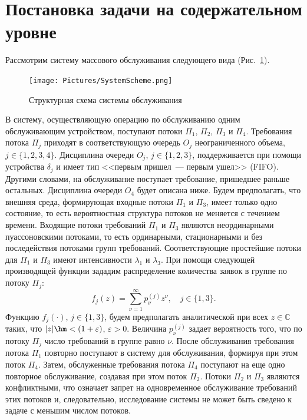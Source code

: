 \section{Постановка задачи на содержательном уровне}
Рассмотрим систему массового обслуживания следующего вида (Рис.~\ref{SystemScheme}).
\begin{figure}[h]
\texttt{[image: Pictures/SystemScheme.png]} 
\caption{Структурная схема системы обслуживания}
\label{SystemScheme}
\end{figure}
В систему,  осуществляющую операцию по обслуживанию одним обслуживающим устройством,  поступают потоки $\Pi_1$,  $\Pi_2$,  $\Pi_3$  и $\Pi_4$. Требования потока $\Pi_j$ приходят в соответствующую очередь $O_j$ неограниченного объема,  $j\in \{1,  2,  3,  4\}$. Дисциплина очереди $O_j$,  $j \in \{1,  2,  3\}$,  поддерживается при помощи устройства $\delta_j$ и имеет тип <<первым пришел~--- первым ушел>> (FIFO). Другими словами,  на обслуживание поступает требование,  пришедшее раньше остальных. Дисциплина очереди $O_4$ будет описана ниже. Будем предполагать,  что внешняя среда,  формирующая входные потоки $\Pi_1$ и $\Pi_3$,  имеет только одно состояние,  то есть вероятностная структура потоков не меняется с течением времени. 
Входящие потоки требований $\Pi_1$ и $\Pi_3$ являются неординарными пуассоновскими потоками,  то есть ординарными,  стационарными и без последействия потоками групп требований. Соответствующие простейшие потоки для $\Pi_1$ и $\Pi_3$ имеют интенсивности $\lambda_1$ и $\lambda_3$. При помощи следующей производящей функции зададим  распределение количества заявок в группе по потоку $\Pi_j$:
\begin{equation}
f_j(z) = \sum_{\nu=1}^{\infty} p_{\nu}^{(j)} z^{\nu},  \quad j\in \{1, 3\}.
\label{GeneratingFunc}
\end{equation}
Функцию $f_j(\cdot)$,  $j\in \{1, 3\}$,  будем предполагать аналитической при всех $z\in \mathbb{C}$ таких,  что $|z|\hm<(1+\varepsilon)$,  $\varepsilon>0$. Величина $p_{\nu}^{(j)}$ задает  вероятность того,  что по потоку $\Pi_j$ число требований в группе равно $\nu$. После обслуживания требования потока $\Pi_1$ повторно поступают в систему для обслуживания,  формируя при этом поток $\Pi_4$. Затем,  обслуженные требования потока $\Pi_4$ поступают на еще одно повторное обслуживание,  создавая при этом поток $\Pi_2$. Потоки $\Pi_2$ и $\Pi_3$ являются конфликтными,  что означает запрет на одновременное обслуживание требований этих потоков и,  следовательно,  исследование системы не может быть сведено к задаче с меньшим числом потоков. 

